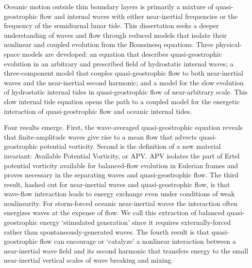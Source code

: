 \documentclass[12pt, oneside]{book}
\begin{document}
  \endgroup

\doublespacing
Oceanic motion outside thin boundary layers is primarily a mixture of quasi-geostrophic flow and internal waves with either near-inertial frequencies or the frequency of the semidiurnal lunar tide.  This dissertation seeks a deeper understanding of waves and flow through reduced models that isolate their nonlinear and coupled evolution from the Boussinesq equations.  Three physical-space models are developed: an equation that describes quasi-geostrophic evolution in an arbitrary and prescribed field of hydrostatic internal waves; a three-component model that couples quasi-geostrophic flow to both near-inertial waves and the near-inertial second harmonic; and a model for the slow evolution of hydrostatic internal tides in quasi-geostrophic flow of near-arbitrary scale.  This slow internal tide equation opens the path to a coupled model for the energetic interaction of quasi-geostrophic flow and oceanic internal tides. 

Four results emerge.  First, the wave-averaged quasi-geostrophic equation reveals that finite-amplitude waves give rise to a mean flow that advects quasi-geostrophic potential vorticity.  Second is the definition of a new material invariant: Available Potential Vorticity, or APV.  APV isolates the part of Ertel potential vorticity available for balanced-flow evolution in Eulerian frames and proves necessary in the separating waves and quasi-geostrophic flow.  The third result, hashed out for near-inertial waves and quasi-geostrophic flow, is that wave-flow interaction leads to energy exchange even under conditions of weak nonlinearity.  For storm-forced oceanic near-inertial waves the interaction often energizes waves at the expense of flow.  We call this extraction of balanced quasi-geostrophic energy `stimulated generation' since it requires externally-forced rather than spontaneously-generated waves.  The fourth result is that quasi-geostrophic flow can encourage or `catalyze' a nonlinear interaction between a near-inertial wave field and its second harmonic that transfers energy to the small near-inertial vertical scales of wave breaking and mixing.  

\let\cleardoublepage\relax\clearpage


\end{document}
